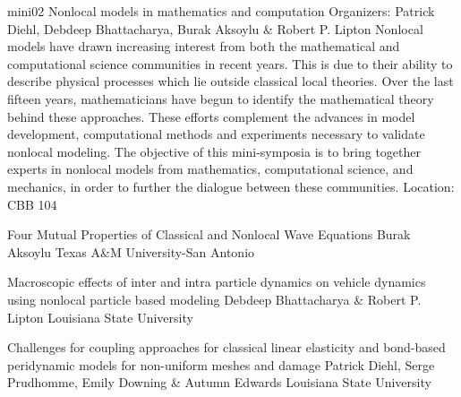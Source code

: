 \mini
{mini02}
{Nonlocal models in mathematics and computation}
{Organizers: Patrick Diehl, Debdeep Bhattacharya, Burak Aksoylu \& Robert P. Lipton}
{Nonlocal models have drawn increasing interest from both the mathematical and computational science communities in recent years. This is due to their ability to describe physical processes which lie outside classical local theories. Over the last fifteen years, mathematicians have begun to identify the mathematical theory behind these approaches. These efforts complement the advances in model development, computational methods and experiments necessary to validate nonlocal modeling. The objective of this mini-symposia is to bring together experts in nonlocal models from mathematics, computational science, and mechanics, in order to further the dialogue between these communities.}
{Location: CBB 104}

\begin{talks}
\item\talk
{Four Mutual Properties of Classical and Nonlocal Wave Equations}
{Burak Aksoylu}
{Texas A\&M University-San Antonio}
\item\talk
{Macroscopic effects of inter and intra particle dynamics on vehicle dynamics using nonlocal particle based modeling}
{Debdeep Bhattacharya \& Robert P. Lipton}
{Louisiana State University}
\item\talk
{Challenges for coupling approaches for classical linear elasticity and bond-based peridynamic models for non-uniform meshes and damage}
{Patrick Diehl, Serge Prudhomme, Emily Downing \& Autumn Edwards}
{Louisiana State University}
\end{talks}
\room
